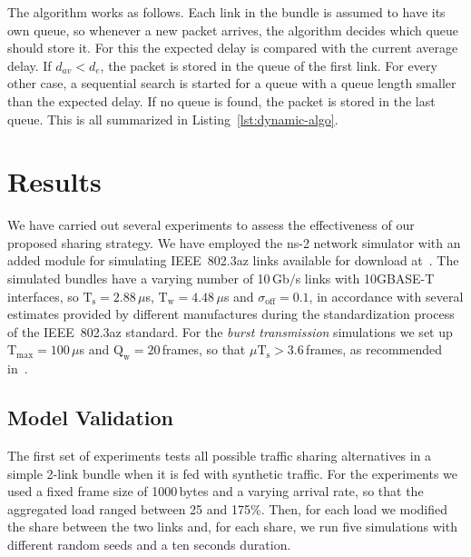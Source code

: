 \documentclass[journal,english,twocolumn,10pt,letterpaper]{IEEEtran}
\newcommand{\Constantconstant}[2]{\mathrm{#1}_{\mathrm{#2}}}
\newcommand{\Ts}{\Constantconstant T s}
\newcommand{\Tw}{\Constantconstant T w}
\newcommand{\Qw}{\Constantconstant Q w}
\newcommand{\Tmax}{\Constantconstant T \max}
\begin{document}
The algorithm works as follows. Each link in the bundle is assumed to have its
own queue, so whenever a new packet arrives, the algorithm decides which queue
should store it. For this the expected delay is compared with the current
average delay. If $d_{av} < d_e$, the packet is stored in the queue of the
first link. For every other case, a sequential search is started for a queue
with a queue length smaller than the expected delay. If no queue is found, the
packet is stored in the last queue. This is all summarized in
Listing~\ref{lst:dynamic-algo}.


\section{Results}
\label{sec:results}

We have carried out several experiments to assess the effectiveness of our
proposed sharing strategy. We have employed the ns-2 network simulator with an
added module for simulating IEEE~802.3az links available for download
at~\cite{14:_networ_simul}. The simulated bundles have a varying number of
10$\,$Gb$/$s links with 10GBASE-T interfaces, so $\Ts=2.88\,\mu$s,
$\Tw=4.48\,\mu$s and $\sigma_{\mathrm{off}}=0.1$, in accordance with several
estimates provided by different manufactures during the standardization
process of the IEEE~802.3az standard. For the \emph{burst transmission}
simulations we set up $\Tmax=100\,\mu$s and $\Qw=20\,$frames, so that
$\mu\Ts>3.6\,$frames, as recommended
in~\cite{herreria12:_gi_g_model_gb_energ_effic_ether}.

\subsection{Model Validation}
\label{sec:model-validation}

The first set of experiments tests all possible traffic sharing alternatives
in a simple 2-link bundle when it is fed with synthetic traffic. For the
experiments we used a fixed frame size of 1000$\,$bytes and a varying arrival
rate, so that the aggregated load ranged between 25 and 175\%. Then, for each
load we modified the share between the two links and, for each share, we run
five simulations with different random seeds and a ten seconds duration.
\end{document}
